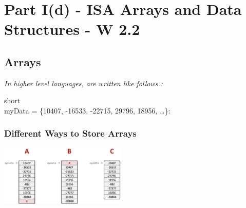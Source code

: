 \chapter{Part I(d) - ISA Arrays and Data Structures - W 2.2}
\section{Arrays}
\textit{In higher level languages, are written like follows :}
\begin{java}
short\[\] myData = \{10407, -16533, -22715, 29796, 18956, \dots\}:
\end{java}
\subsection{Different Ways to Store Arrays}
\begin{center}
    \includegraphics[width=0.45\textwidth]{chapters/chapter1d/images/arrays.png}
\end{center}

